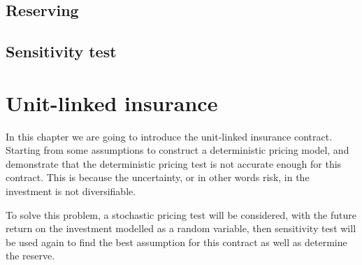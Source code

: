 \documentclass{report}
\begin{document}
\section{Reserving}


\section{Sensitivity test}
















\chapter{Unit-linked insurance}     \label{unit-linked}








In this chapter we are going to introduce the unit-linked insurance contract. Starting from some assumptions to construct a deterministic pricing model, and demonstrate that the deterministic pricing test is not accurate enough for this contract. This is because the uncertainty, or in other words risk, in the investment is not diversifiable.  

To solve this problem, a stochastic pricing test will be considered, with the future return on the investment modelled as a random variable, then sensitivity test will be used again to find the best assumption for this contract as well as determine the reserve. 
\end{document}
